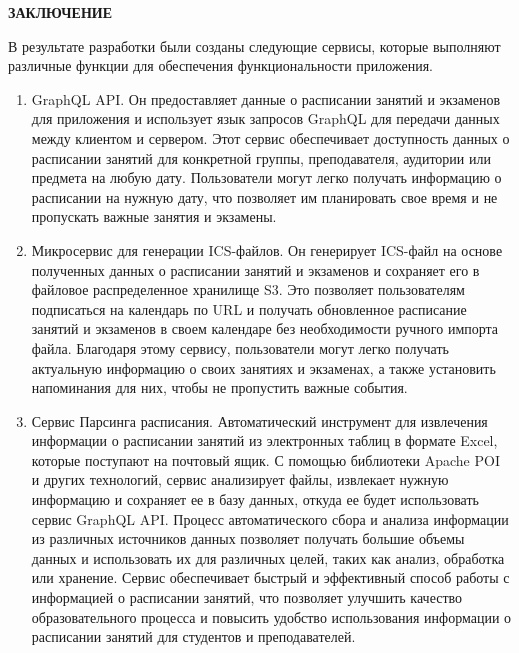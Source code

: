 \newpage
\begin{center}
  \textbf{\large ЗАКЛЮЧЕНИЕ}
\end{center}


В результате разработки были созданы следующие сервисы, которые выполняют различные функции для обеспечения функциональности приложения.
\begin{enumerate}

    \item GraphQL API. Он предоставляет данные о расписании занятий и экзаменов для приложения
    и использует язык запросов GraphQL для передачи данных между клиентом и сервером.
    Этот сервис обеспечивает доступность данных о расписании занятий для конкретной группы,
    преподавателя, аудитории или предмета на любую дату. Пользователи могут легко получать информацию
    о расписании на нужную дату, что позволяет им планировать свое время и не пропускать важные занятия и экзамены.

    \item Микросервис для генерации ICS-файлов. Он генерирует ICS-файл на основе полученных данных
    о расписании занятий и экзаменов и сохраняет его в файловое распределенное хранилище S3.
    Это позволяет пользователям подписаться на календарь по URL и получать обновленное расписание
    занятий и экзаменов в своем календаре без необходимости ручного импорта файла.
    Благодаря этому сервису, пользователи могут легко получать актуальную информацию
    о своих занятиях и экзаменах, а также установить напоминания для них, чтобы не пропустить важные события.

    \item Сервис Парсинга расписания. Автоматический инструмент для извлечения информации 
    о расписании занятий из электронных таблиц в формате Excel, которые поступают на почтовый ящик.
    С помощью библиотеки Apache POI и других технологий, сервис анализирует файлы,
    извлекает нужную информацию и сохраняет ее в базу данных,
    откуда ее будет использовать сервис GraphQL API.
    Процесс автоматического сбора и анализа информации из различных
    источников данных позволяет получать большие объемы данных и
    использовать их для различных целей, таких как анализ, обработка или хранение.
    Сервис обеспечивает быстрый и эффективный способ работы с информацией
    о расписании занятий, что позволяет улучшить качество образовательного процесса и
    повысить удобство использования информации о расписании занятий для студентов и преподавателей.


\end{enumerate}

